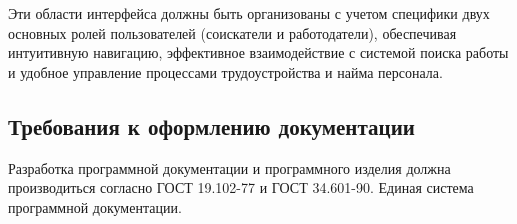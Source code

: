 Эти области интерфейса должны быть организованы с учетом специфики двух основных ролей пользователей (соискатели и работодатели), обеспечивая интуитивную навигацию, эффективное взаимодействие с системой поиска работы и удобное управление процессами трудоустройства и найма персонала.


\subsection{Требования к оформлению документации}

Разработка программной документации и программного изделия должна производиться согласно ГОСТ 19.102-77 и ГОСТ 34.601-90. Единая система программной документации.
